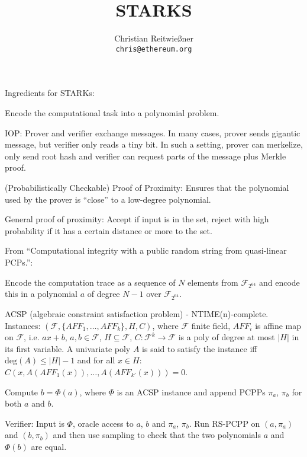 \documentclass[11pt,letterpaper]{article}
\date{}
\begin{document}


\title{STARKS}

\author{Christian Reitwießner \\ 
{\tt chris@ethereum.org}}


\maketitle



Ingredients for STARKs:

Encode the computational task into a polynomial problem.

IOP: Prover and verifier exchange messages. In many cases, prover sends gigantic message, but verifier only reads a tiny bit.
In such a setting, prover can merkelize, only send root hash and verifier can request parts of the message plus Merkle proof.

(Probabilistically Checkable) Proof of Proximity: Ensures that the polynomial used by the prover is ``close'' to a low-degree polynomial.

General proof of proximity: Accept if input is in the set, reject with high probability if it has a certain distance or more to the set.

From ``Computational integrity with a public random string from
quasi-linear PCPs.'':

Encode the computation trace as a sequence of $N$ elements from $\mathcal{F}_{2^64}$ and encode this in a polynomial $a$ of
degree $N-1$ over $\mathcal{F}_{2^64}$.

ACSP (algebraic constraint satisfaction problem) - NTIME(n)-complete.
  Instances: $(\mathcal{F}, \{AFF_1, \dots, AFF_k\}, H, C)$, where $\mathcal{F}$ finite field, $AFF_i$ is affine map on $\mathcal{F}$,
              i.e. $ax + b$, $a,b \in \mathcal{F}$, $H \subseteq \mathcal{F}$, $C\colon \mathcal{F}^k \to \mathcal{F}$ is a poly of
              degree at most $ |H|$ in its first variable.
  A univariate poly $A$ is said to satisfy the instance iff $\mathrm{deg}(A) \le |H| -1$ and for all $x \in H$: $C(x, A(AFF_1(x)), \dots, A(AFF_{k'}(x))) = 0$.

Compute $b = \Phi(a)$, where $\Phi$ is an ACSP instance and append PCPPs $\pi_a$, $\pi_b$ for both $a$ and $b$.

Verifier: Input is $\Phi$, oracle access to $a$, $b$ and $\pi_a$, $\pi_b$.
Run RS-PCPP on $(a, \pi_a)$ and $(b, \pi_b)$ and then use sampling to check that the two polynomials
$a$ and $\Phi(b)$ are equal.
\end{document}
